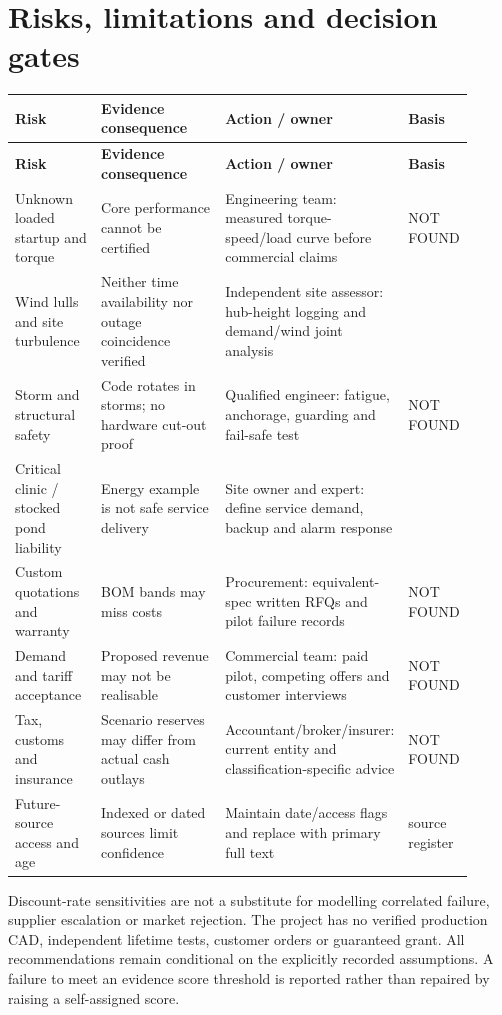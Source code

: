 \documentclass[11pt,a4paper]{article}
\begin{document}
\clearpage\section{Risks, limitations and decision gates}
{\small
\setlength{\tabcolsep}{3pt}\renewcommand{\arraystretch}{1.18}
\begin{longtable}{@{}>{\raggedright\arraybackslash}p{0.1916\linewidth}>{\raggedright\arraybackslash}p{0.2874\linewidth}>{\raggedright\arraybackslash}p{0.3273\linewidth}>{\raggedright\arraybackslash}p{0.1038\linewidth}@{}}
\toprule \textbf{Risk} & \textbf{Evidence consequence} & \textbf{Action / owner} & \textbf{Basis} \\ \midrule
\endfirsthead\toprule \textbf{Risk} & \textbf{Evidence consequence} & \textbf{Action / owner} & \textbf{Basis} \\ \midrule
\endhead\bottomrule\endfoot
Unknown loaded startup and torque & Core performance cannot be certified & Engineering team: measured torque-speed/load curve before commercial claims & NOT FOUND \\
Wind lulls and site turbulence & Neither time availability nor outage coincidence verified & Independent site assessor: hub-height logging and demand/wind joint analysis & [S/A] \cite{windguide,windrepo} \\
Storm and structural safety & Code rotates in storms; no hardware cut-out proof & Qualified engineer: fatigue, anchorage, guarding and fail-safe test & NOT FOUND \\
Critical clinic / stocked pond liability & Energy example is not safe service delivery & Site owner and expert: define service demand, backup and alarm response & [S/A] \cite{clinic,fao} \\
Custom quotations and warranty & BOM bands may miss costs & Procurement: equivalent-spec written RFQs and pilot failure records & NOT FOUND \\
Demand and tariff acceptance & Proposed revenue may not be realisable & Commercial team: paid pilot, competing offers and customer interviews & NOT FOUND \\
Tax, customs and insurance & Scenario reserves may differ from actual cash outlays & Accountant/broker/insurer: current entity and classification-specific advice & NOT FOUND \\
Future-source access and age & Indexed or dated sources limit confidence & Maintain date/access flags and replace with primary full text & [S] source register \\
\end{longtable}}
Discount-rate sensitivities are not a substitute for modelling correlated failure, supplier escalation or market rejection. The project has no verified production CAD, independent lifetime tests, customer orders or guaranteed grant. All recommendations remain conditional on the explicitly recorded assumptions. A failure to meet an evidence score threshold is reported rather than repaired by raising a self-assigned score.
\end{document}
